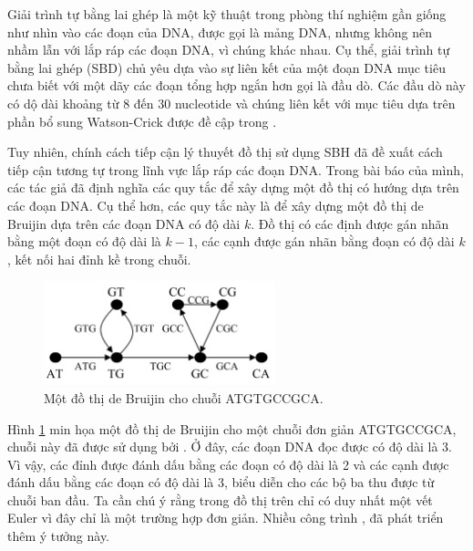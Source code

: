 \documentclass[14pt, a4paper]{article}
\numberwithin{equation}{section}
\numberwithin{figure}{section}
\numberwithin{dl}{section}
\numberwithin{md}{section}
\numberwithin{bd}{section}
\numberwithin{dn}{section}
\numberwithin{hq}{section}
\begin{document}
    Giải trình tự bằng lai ghép là một kỹ thuật trong phòng thí nghiệm gần giống như nhìn vào các đoạn của DNA,
    được gọi là mảng DNA, nhưng không nên nhầm lẫn với lắp ráp các đoạn DNA, vì chúng khác nhau.
    Cụ thể, giải trình tự bằng lai ghép (SBD) chủ yêu dựa vào sự liên kết của một đoạn DNA mục tiêu chưa biết với một dãy các đoạn tổng hợp ngắn hơn gọi là đầu dò.
    Các đầu dò này có dộ dài khoảng từ 8 đến 30 nucleotide và chúng liên kết với mục tiêu dựa trên phần bổ sung Watson-Crick được đề cập trong \cite{de1946combinatorial}.

    Tuy nhiên, chính cách tiếp cận lý thuyết đồ thị sử dụng SBH \cite{idury1995new} đã đề xuất cách tiếp cận tương tự trong lĩnh vực lắp ráp các đoạn DNA.
    Trong bài báo của mình, các tác giả đã định nghĩa các quy tắc để xây dựng một đồ thị có hướng dựa trên các đoạn DNA.
    Cụ thể hơn, các quy tắc này là để xây dựng một đồ thị de Bruijin dựa trên các đoạn DNA có độ dài $k$.
    Đồ thị có các định được gán nhãn bằng một đoạn có độ dài là $k-1$, các cạnh được gán nhãn bằng đoạn có độ dài $k$, kết nối hai đỉnh kề trong chuỗi.

    \begin{figure}[h!]
        \centering
        \includegraphics[width=0.6\textwidth]{2.png}
        \caption{Một đồ thị de Bruijin cho chuỗi ATGTGCCGCA.}
        \label{fig:2}
    \end{figure}

    Hình \ref{fig:2} min họa một đồ thị de Bruijin cho một chuỗi đơn giản ATGTGCCGCA, chuỗi này đã được sử dụng bởi \cite{idury1995new}.
    Ở đây, các đoạn DNA đọc được có độ dài là 3.
    Vì vậy, các đỉnh được đánh dấu bằng các đoạn có độ dài là 2 và các cạnh được đánh dấu bằng các đoạn có độ dài là 3, biểu diễn cho các bộ ba thu được từ chuỗi ban đầu.
    Ta cần chú ý rằng trong đồ thị trên chỉ có duy nhất một vết Euler vì đây chỉ là một trường hợp đơn giản.
    Nhiều công trình \cite{pevzner2000computational}, \cite{pevzner1995dna} đã phát triển thêm ý tưởng này.
\end{document}
